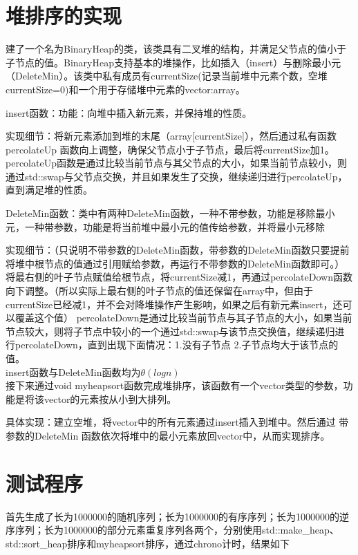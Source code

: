 \documentclass[UTF8]{ctexart}
\begin{document}
\pagestyle{fancy}
\fancyhead{}

\section{堆排序的实现}
建了一个名为BinaryHeap的类，该类具有二叉堆的结构，并满足父节点的值小于子节点的值。BinaryHeap支持基本的堆操作，比如插入（insert）与删除最小元（DeleteMin）。该类中私有成员有currentSize(记录当前堆中元素个数，空堆currentSize=0)和一个用于存储堆中元素的vector:array。

insert函数：功能：向堆中插入新元素，并保持堆的性质。

实现细节：将新元素添加到堆的末尾（array[currentSize]），然后通过私有函数percolateUp 函数向上调整，确保父节点小于子节点，最后将currentSize加1。percolateUp函数是通过比较当前节点与其父节点的大小，如果当前节点较小，则通过std::swap与父节点交换，并且如果发生了交换，继续递归进行percolateUp，直到满足堆的性质。


DeleteMin函数：类中有两种DeleteMin函数，一种不带参数，功能是移除最小元，一种带参数，功能是将当前堆中最小元的值传给参数，并将最小元移除

实现细节：（只说明不带参数的DeleteMin函数，带参数的DeleteMin函数只要提前将堆中根节点的值通过引用赋给参数，再运行不带参数的DeleteMin函数即可。）将最右侧的叶子节点赋值给根节点，将currentSize减1，再通过percolateDown函数向下调整。（所以实际上最右侧的叶子节点的值还保留在array中，但由于currentSize已经减1，并不会对降堆操作产生影响，如果之后有新元素insert，还可以覆盖这个值）
percolateDown是通过比较当前节点与其子节点的大小，如果当前节点较大，则将子节点中较小的一个通过std::swap与该节点交换值，继续递归进行percolateDown，直到出现下面情况：1.没有子节点 2.子节点均大于该节点的值。
\\


insert函数与DeleteMin函数均为$\theta(logn)$
\\


接下来通过void myheapsort函数完成堆排序，该函数有一个vector类型的参数，功能是将该vector的元素按从小到大排列。

具体实现：建立空堆，将vector中的所有元素通过insert插入到堆中。然后通过 带参数的DeleteMin 函数依次将堆中的最小元素放回vector中，从而实现排序。

\section{测试程序}
首先生成了长为1000000的随机序列；长为1000000的有序序列；长为1000000的逆序序列；长为1000000的部分元素重复序列各两个，分别使用std::make\_heap、std::sort\_heap排序和myheapsort排序，通过chrono计时，结果如下
\end{document}
